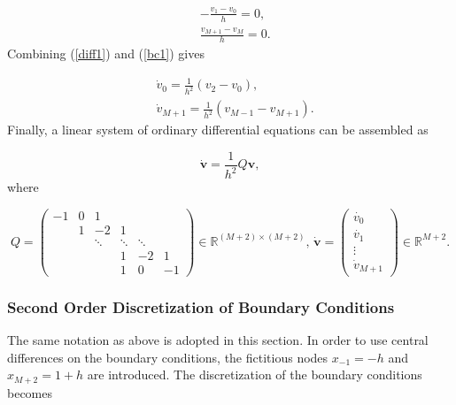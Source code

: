 \begin{equation}
\begin{split}
     &-\frac{v_1-v_0}{h} = 0, \\ 
     &\frac{v_{M+1}-v_{M}}{h} = 0.
\label{bc1}
\end{split}
\end{equation} 
Combining (\ref{diff1}) and (\ref{bc1}) gives

\begin{equation}
\begin{split}
     &\dot{v}_0 = \frac{1}{h^2}(v_2 - v_0), \\
     &\dot{v}_{M+1} = \frac{1}{h^2}(v_{M-1}-v_{M+1}).
\label{bc2}
\end{split}
\end{equation} 
Finally, a linear system of ordinary differential equations can be assembled as 

\begin{equation*}
    \dot{\boldsymbol{v}} = \frac{1}{h^2}Q\boldsymbol{v},
\end{equation*}
where 

\begin{equation*}
Q = \begin{pmatrix}
    -1 & 0 & 1 & & \\
     & 1 & -2 & 1 & \\
    & & \ddots & \ddots & \ddots &\\
     & & & 1 & -2 & 1 \\
     &  & & 1& 0 & -1
    \end{pmatrix} \in \mathbb{R}^{(M+2) \times (M+2)}, \, 
    \dot{\boldsymbol{v}} = \begin{pmatrix}
    \dot{v_0} \\
    \dot{v_1} \\
    \vdots \\
    \dot{v}_{M+1} 
    \end{pmatrix} \in \mathbb{R}^{M+2}.
\end{equation*}

\subsubsection{Second Order Discretization of Boundary Conditions}

The same notation as above is adopted in this section. In order to use central differences on the boundary conditions, the fictitious nodes $x_{-1} = -h$ and $x_{M + 2} = 1 + h$ are introduced. The discretization of the boundary conditions becomes

